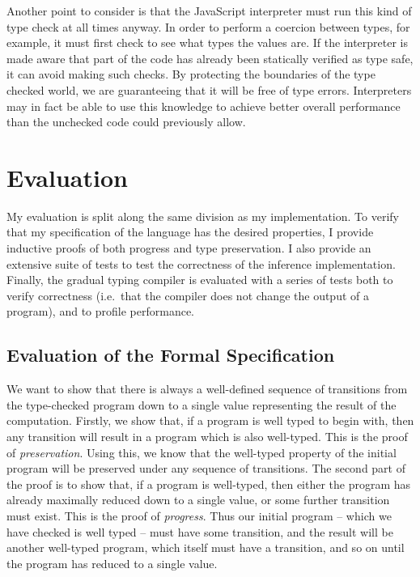 \documentclass[12pt,a4paper,twoside,openright]{report}
\theoremstyle{definition}
\theoremstyle{dotless}
\begin{document}
Another point to consider is that the JavaScript interpreter must run this kind
of type check at all times anyway. In order to perform a coercion between
types, for example, it must first check to see what types the values are. If
the interpreter is made aware that part of the code has already been statically
verified as type safe, it can avoid making such checks. By protecting the
boundaries of the type checked world, we are guaranteeing that it will be free
of type errors. Interpreters may in fact be able to use this knowledge to
achieve better overall performance than the unchecked code could previously
allow.







\chapter{Evaluation}\label{evaluation}

My evaluation is split along the same division as my implementation. To verify
that my specification of the language has the desired properties, I provide
inductive proofs of both progress and type preservation.  I also provide an
extensive suite of tests to test the correctness of the inference
implementation. Finally, the gradual typing compiler is evaluated with a series
of tests both to verify correctness (i.e.~that the compiler does not change the
output of a program), and to profile performance.

\section{Evaluation of the Formal Specification}

We want to show that there is always a well-defined sequence of transitions
from the type-checked program down to a single value
representing the result of the computation. Firstly, we show that, if a program
is well typed to begin with, then any transition will result in a program which
is also well-typed. This is the proof of \textit{preservation}.  Using this, we
know that the well-typed property of the initial program will be preserved
under any sequence of transitions. The second part of the proof is to show
that, if a program is well-typed, then either the program has already maximally
reduced down to a single value, or some further transition must exist. This is
the proof of \textit{progress}. Thus our initial program -- which we have
checked is well typed -- must have some transition, and the result will be
another well-typed program, which itself must have a transition, and so on
until the program has reduced to a single value.
\end{document}

